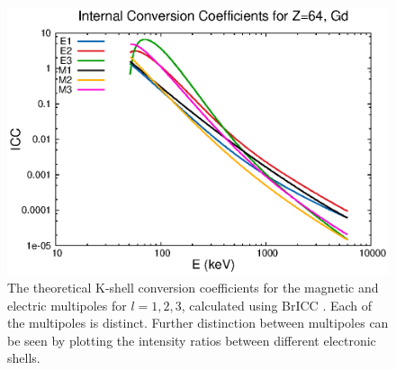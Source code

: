 \begin{figure}
    \centering
    \includegraphics[scale=1]{Introduction_Figs/ICCGd.eps}
    \caption{The theoretical K-shell conversion coefficients for the magnetic and electric multipoles for $l=1,2,3$, calculated using BrICC \citep{kibedi08:_BRICC}. Each of the multipoles is distinct. Further distinction between multipoles can be seen by plotting the intensity ratios between different electronic shells.}
    \label{fig:icc_gd}
\end{figure}